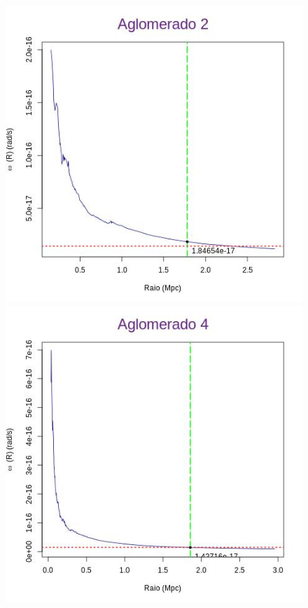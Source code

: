 \begin{anexosenv}
\begin{figure}[H] %
\vspace{-2pt}
\begin{center}
\includegraphics[scale=.3]{04-figuras/selec20/perfil02}%
\includegraphics[scale=.3]{04-figuras/selec20/perfil04}

\end{center}
\end{figure}
\end{anexosenv}
